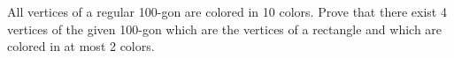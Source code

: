 All vertices of a regular 100-gon are colored in 10 colors. Prove that there exist 4 vertices of the given 100-gon which are the vertices of a rectangle and which are colored in at most 2 colors.